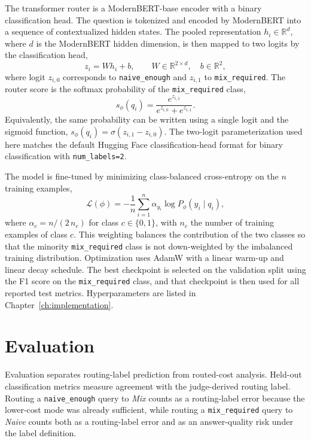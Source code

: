 \documentclass[english, bibtex]{kththesis}               %
\numberwithin{listing}{chapter}
\begin{document}
The transformer router is a ModernBERT-base \cite{warner2024modernbert} encoder with a binary classification head. The question is tokenized and encoded by ModernBERT into a sequence of contextualized hidden states. The pooled representation \(h_i \in \mathbb{R}^{d}\), where \(d\) is the ModernBERT hidden dimension, is then mapped to two logits by the classification head,
\begin{equation}
\label{eq:modernBertLogits}
z_i = W h_i + b,
\qquad
W \in \mathbb{R}^{2 \times d}, \quad b \in \mathbb{R}^{2},
\end{equation}
where logit \(z_{i,0}\) corresponds to \texttt{naive\_enough} and \(z_{i,1}\) to \texttt{mix\_required}. The router score is the softmax probability of the \texttt{mix\_required} class,
\begin{equation}
\label{eq:modernBertSoftmax}
s_\phi(q_i)
=
\frac{e^{z_{i,1}}}{e^{z_{i,0}} + e^{z_{i,1}}}.
\end{equation}
Equivalently, the same probability can be written using a single logit and the sigmoid function, $s_\phi(q_i) = \sigma(z_{i,1} - z_{i,0})$. The two-logit parameterization used here matches the default Hugging Face classification-head format for binary classification with \texttt{num\_labels=2}.

The model is fine-tuned by minimizing class-balanced cross-entropy on the \(n\) training examples,
\begin{equation}
\label{eq:modernBertLoss}
\mathcal{L}(\phi)
=
-\frac{1}{n}\sum_{i=1}^{n}
\alpha_{y_i} \log P_\phi(y_i \mid q_i),
\end{equation}
where \(\alpha_{c} = n / (2\,n_c)\) for class \(c \in \{0, 1\}\), with \(n_c\) the number of training examples of class \(c\). This weighting balances the contribution of the two classes so that the minority \texttt{mix\_required} class is not down-weighted by the imbalanced training distribution. Optimization uses AdamW \cite{loshchilov2019decoupled} with a linear warm-up and linear decay schedule. The best checkpoint is selected on the validation split using the F1 score on the \texttt{mix\_required} class, and that checkpoint is then used for all reported test metrics. Hyperparameters are listed in Chapter~\ref{ch:implementation}.

\section{Evaluation}
\label{sec:methodEvaluation}

Evaluation separates routing-label prediction from routed-cost analysis. Held-out classification metrics measure agreement with the judge-derived routing label. Routing a \texttt{naive\_enough} query to \emph{Mix} counts as a routing-label error because the lower-cost mode was already sufficient, while routing a \texttt{mix\_required} query to \emph{Naive} counts both as a routing-label error and as an answer-quality risk under the label definition.
\end{document}
